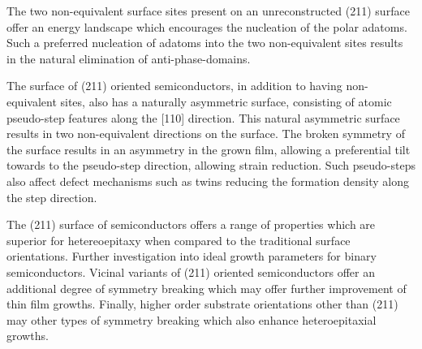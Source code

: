 The two non-equivalent surface sites present on an unreconstructed (211) surface offer an energy landscape which encourages the nucleation of the polar adatoms.
Such a preferred nucleation of adatoms into the two non-equivalent sites results in the natural elimination of anti-phase-domains.

The surface of (211) oriented semiconductors, in addition to having non-equivalent sites, also has a naturally asymmetric surface, consisting of atomic pseudo-step features along the [110] direction.
This natural asymmetric surface results in two non-equivalent directions on the surface.
The broken symmetry of the surface results in an asymmetry in the grown film, allowing a preferential tilt towards to the pseudo-step direction, allowing strain reduction.
Such pseudo-steps also affect defect mechanisms such as twins reducing the formation density along the step direction.

The (211) surface of semiconductors offers a range of properties which are superior for hetereoepitaxy when compared to the traditional surface orientations.
Further investigation into ideal growth parameters for binary semiconductors.
Vicinal variants of (211) oriented semiconductors offer an additional degree of symmetry breaking which may offer further improvement of thin film growths.
Finally, higher order substrate orientations other than (211) may other types of symmetry breaking which also enhance heteroepitaxial growths.
